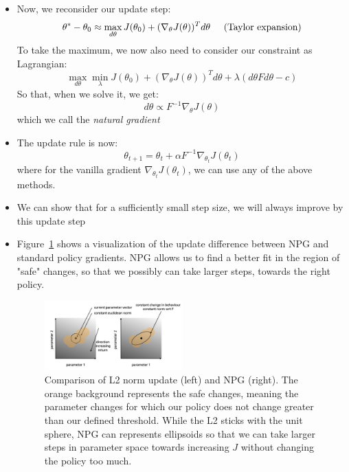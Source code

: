 \begin{itemize}
	\item Now, we reconsider our update step:
	\begin{equation*}
		\begin{split}
			\theta^{*}-\theta_0 & \approx \max_{d\theta} J(\theta_0) + (\nabla_{\theta} J(\theta))^T d\theta \hspace{5mm}\text{(Taylor expansion)}\\
		\end{split}
	\end{equation*}
	To take the maximum, we now also need to consider our constraint as Lagrangian:
	$$\max_{d\theta}\min_{\lambda} J(\theta_0) + (\nabla_{\theta} J(\theta))^T d\theta + \lambda (d\theta F d\theta-c)$$
	So that, when we solve it, we get:
	$$d\theta  \propto F^{-1}\nabla_{\theta}J(\theta)$$
	which we call the \textit{natural gradient}
	\item The update rule is now:
	$$\theta_{t+1} = \theta_t + \alpha F^{-1}\nabla_{\theta_t}J(\theta_t)$$
	where for the vanilla gradient $\nabla_{\theta_t}J(\theta_t)$, we can use any of the above methods.
	\item We can show that for a sufficiently small step size, we will always improve by this update step 
	\item Figure~\ref{fig:rl_policy_gradients_NPG} shows a visualization of the update difference between NPG and standard policy gradients. NPG allows us to find a better fit in the region of "safe" changes, so that we possibly can take larger steps, towards the right policy.
	
	\begin{figure}[ht!]
		\centering
		\includegraphics[width=0.5\textwidth]{figures/rl_policy_gradients_NPG.png}
		\caption{Comparison of L2 norm update (left) and NPG (right). The orange background represents the safe changes, meaning the parameter changes for which our policy does not change greater than our defined threshold. While the L2 sticks with the unit sphere, NPG can represents ellipsoids so that we can take larger steps in parameter space towards increasing $J$ without changing the policy too much.}
		\label{fig:rl_policy_gradients_NPG}
	\end{figure}


\end{itemize}
